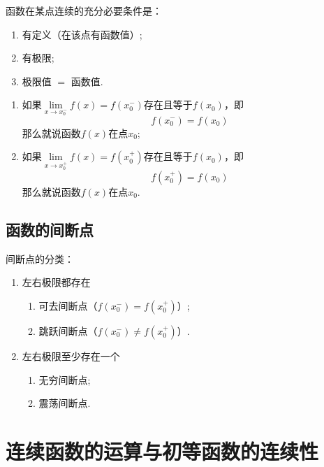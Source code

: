 \begin{note}
	\label{not:tiaojian}
	函数在某点连续的{\heiti 充分必要条件}是：
	\begin{enumerate}[label=\( \Circled{\arabic*} \)]
		\item 有定义（在该点有函数值）;
		\item 有极限;
		\item 极限值 \( = \) 函数值.
	\end{enumerate}
\end{note}

\begin{definition}[左右连续]
	\begin{enumerate}
		\item 如果\( \lim\limits_{x \to x_{0}^{-}}f(x) = f(x_{0}^{-}) \)存在且等于\( f(x_{0}) \)，即
		\[ f(x_{0}^{-}) = f(x_{0}) \]
		那么就说函数\( f(x) \)在点\( x_{0} \);
		\item 如果\( \lim\limits_{x \to x_{0}^{+}}f(x) = f(x_{0}^{+}) \)存在且等于\( f(x_{0}) \)，即
		\[ f(x_{0}^{+}) = f(x_{0}) \]
		那么就说函数\( f(x) \)在点\( x_{0} \).
	\end{enumerate}
\end{definition}

\subsection{函数的间断点}
\begin{note}
	间断点的分类：
	\begin{enumerate}[label=\Roman*类：]
		\item 左右极限都存在
		\begin{enumerate}
			\item 可去间断点（\( f(x_{0}^{-}) = f(x_{0}^{+}) \)）;
			\item 跳跃间断点（\( f(x_{0}^{-}) \neq f(x_{0}^{+}) \)）.
		\end{enumerate}
		\item 左右极限至少存在一个
		\begin{enumerate}
			\item 无穷间断点;
			\item 震荡间断点.
		\end{enumerate}
	\end{enumerate}
\end{note}

\section{连续函数的运算与初等函数的连续性}

